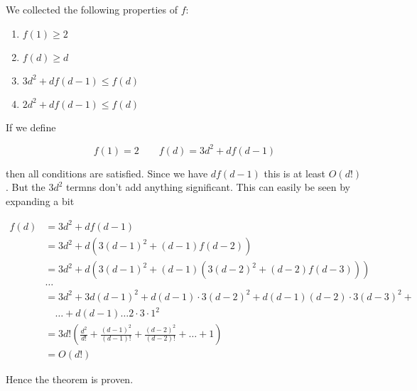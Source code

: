 \begin{pr}
We collected the following properties of $f$:
\begin{enumerate}
\item \label{seidelFone} $f(1)\geq 2$
\item \label{seidelFtwo} $f(d)\geq d$
\item \label{seidelFthree} $3d^2+df(d-1) \leq f(d)$
\item \label{seidelFfour} $2d^2+df(d-1) \leq f(d)$
\end{enumerate}

If we define 

\[f(1) = 2 \qquad f(d) = 3d^2 + df(d-1)\]

then all conditions are satisfied. Since we have $df(d-1)$ this is at least $O(d!)$. But the $3d^2$ termns don't add anything significant. This can easily be seen by expanding a bit

\begin{align*}
f(d) &= 3d^2 + df(d-1)\\
	&= 3d^2+d(3(d-1)^2 + (d-1)f(d-2))\\
	&= 3d^2+d(3(d-1)^2 + (d-1)(3(d-2)^2 + (d-2)f(d-3)))\\
	&\hdots\\
	&=3d^2 +3d(d-1)^2 + d(d-1)\cdot 3(d-2)^2 + d(d-1)(d-2) \cdot 3(d-3)^2 +\\
	&\quad \ldots + d(d-1)\ldots 2\cdot 3 \cdot 1^2\\
	&=3d! \left(\frac{d^2}{d!} + \frac{(d-1)^2}{(d-1)!} + \frac{(d-2)^2}{(d-2)!} + \ldots + 1\right)\\
	&= O(d!)
\end{align*}

Hence the theorem is proven.
\end{pr}




